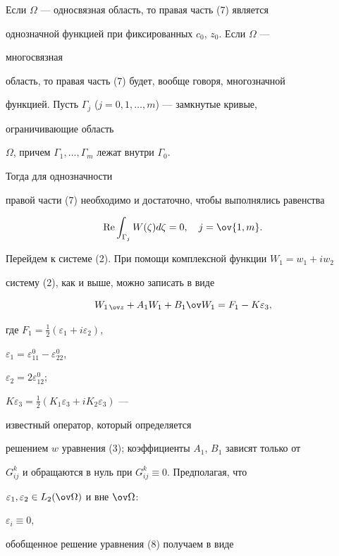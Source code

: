  


Если $\Omega$ --- односвязная область, то правая часть (7) является 


однозначной функцией при фиксированных $c_0$, $z_0$. Если $\Omega$ --- 


многосвязная 


область, то правая часть (7) будет, вообще говоря, многозначной 


функцией. Пусть $\Gamma_j$ ($j=0,1,\dotsc,m$) --- замкнутые кривые, 


ограничивающие область 


$\Omega$, причем $\Gamma_1,\dotsc,\Gamma_m$ лежат внутри $\Gamma_0$. 


Тогда для однозначности 


правой части (7) необходимо и достаточно, чтобы выполнялись равенства 


$$ 


\re\int_{\Gamma_j}W(\zeta)d\zeta=0,\quad j=\ov{1,m}. 


$$ 


 


Перейдем к системе (2). При помощи комплексной функции $W_1=w_1+iw_2$ 


систему (2), как и выше, можно записать в виде 


\begin{equation} 


W_{1\,\ov z}+A_1W_1+B_1\ov W_1=F_1-K\varepsilon_3, 


\end{equation} 


где $F_1=\frac{1}{2}(\varepsilon_1+i\varepsilon_2)$, 


$\varepsilon_1=\varepsilon^0_{11}-\varepsilon^0_{22}$, 


$\varepsilon_2=2\varepsilon^0_{12}$; 


$K\varepsilon_3=\frac{1}{2}(K_1\varepsilon_3+iK_2\varepsilon_3)$ --- 


известный оператор, который определяется 


решением $w$ уравнения (3); коэффициенты $A_1$, $B_1$ зависят только от 


$G^k_{ij}$ и обращаются в нуль при $G^k_{ij}\equiv 0$. Предполагая, что 


$\varepsilon_1,\varepsilon_2\in L_2(\ov\Omega)$ и вне $\ov \Omega$:


$\varepsilon_i\equiv 0$, 


обобщенное решение уравнения (8) получаем в виде 


